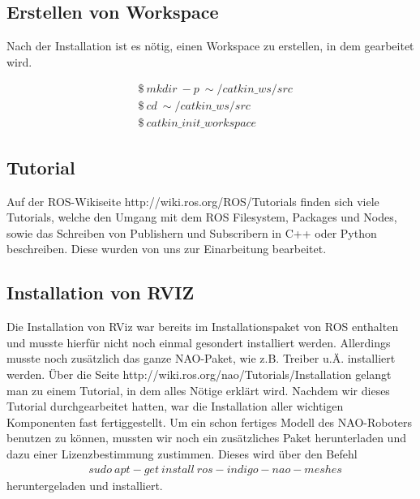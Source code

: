 \documentclass{scrartcl}
\begin{document}
\subsection{Erstellen von Workspace}

Nach der Installation ist es nötig, einen Workspace zu erstellen, in dem gearbeitet wird.

\begin{align}
&\$\ mkdir\ -p\ \sim/catkin\_ws/src\\
&\$\ cd\ \sim/catkin\_ws/src\\
&\$\ catkin\_init\_workspace
\end{align}
\subsection{Tutorial}
Auf der ROS-Wikiseite http://wiki.ros.org/ROS/Tutorials finden sich viele Tutorials, welche den Umgang mit dem ROS Filesystem, Packages und Nodes, sowie das Schreiben von Publishern und Subscribern in C++ oder Python beschreiben.
Diese wurden von uns zur Einarbeitung bearbeitet.
\subsection{Installation von RVIZ}
Die Installation von RViz war bereits im Installationspaket von ROS enthalten und musste hierfür nicht noch einmal gesondert installiert werden. Allerdings musste noch zusätzlich das ganze NAO-Paket, wie z.B. Treiber u.Ä. installiert werden. Über die Seite http://wiki.ros.org/nao/Tutorials/Installation gelangt man zu einem Tutorial, in dem alles Nötige erklärt wird. Nachdem wir dieses Tutorial durchgearbeitet hatten, war die Installation aller wichtigen Komponenten fast fertiggestellt. Um ein schon fertiges Modell des NAO-Roboters benutzen zu können, mussten wir noch ein zusätzliches Paket herunterladen und dazu einer Lizenzbestimmung zustimmen. Dieses wird über den Befehl
\begin{align}
&sudo\ apt-get\ install\ ros-indigo-nao-meshes
\end{align}
heruntergeladen und installiert.
\end{document}
